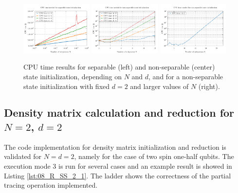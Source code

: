 \documentclass[pra, onecolumn, notitlepage, floats, 11pt]{revtex4-1}
\begin{document}
\begin{figure}[!h]
    \centering
    \includegraphics[width=0.32\textwidth]{images/separable.pdf}
    \hfill
    \includegraphics[width=0.32\textwidth]{images/nonseparable.pdf}
    \hfill
    \includegraphics[width=0.32\textwidth]{images/nonseparable_2.pdf}
    \caption{\label{fig:08_R_SS_1} CPU time results for separable (left) and non-separable (center) state initialization, depending on \( N \) and \( d \), and for a non-separable state initialization with fixed \( d=2 \) and larger values of \( N \) (right).}
\end{figure}



\subsection{Density matrix calculation and reduction for \( N = 2 \), \( d = 2 \)}
The code implementation for density matrix initialization and reduction is validated for \( N = d = 2 \), namely for the case of two spin one-half qubits. The execution mode 3 is run for several cases and an example result is showed in Listing \ref{lst:08_R_SS_2_1}. The ladder shows the correctness of the partial tracing operation implemented.
\end{document}
